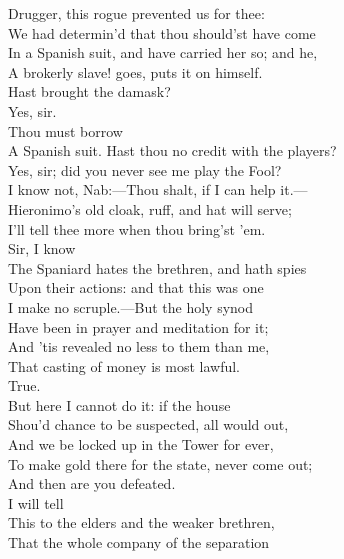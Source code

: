 \documentclass[a4paper,oneside]{memoir}
\begin{document}
\begin{drama*}
\facespeaks Drugger, this rogue prevented us for thee:\\
We had determin'd that thou should'st have come\\
In a Spanish suit, and have carried her so; and he,\\
A brokerly slave! goes, puts it on himself.\\
Hast brought the damask?\\
\druggerspeaks {} Yes, sir.\\
\facespeaks {} Thou must borrow\\
A Spanish suit. Hast thou no credit with the players?\\
\druggerspeaks Yes, sir; did you never see me play the Fool?\\
\facespeaks I know not, Nab:---Thou shalt, if I can help it.---\\
Hieronimo's old cloak, ruff, and hat will serve;\\
I'll tell thee more when thou bring'st 'em.\\
\ananiasspeaks {} Sir, I know\\
The Spaniard hates the brethren, and hath spies\\
Upon their actions: and that this was one\\
I make no scruple.---But the holy synod\\
Have been in prayer and meditation for it;\\
And 'tis revealed no less to them than me,\\
That casting of money is most lawful.\\
\subtlespeaks {} True.\\
But here I cannot do it: if the house\\
Shou'd chance to be suspected, all would out,\\
And we be locked up in the Tower for ever,\\
To make gold there for the state, never come out;\\
And then are you defeated.\\
\ananiasspeaks {} I will tell\\
This to the elders and the weaker brethren,\\
That the whole company of the separation\\

\end{drama*}
\end{document}
